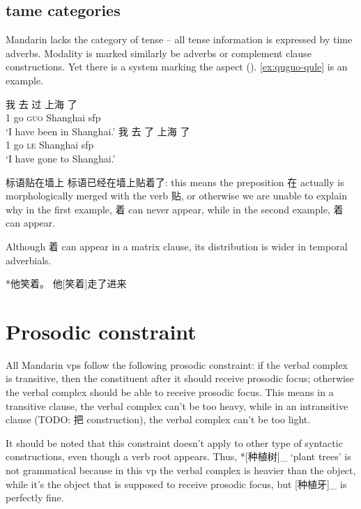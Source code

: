 \documentclass[UTF8, a4paper, oneside, scheme=plain]{ctexrep}
\newcommand{\asis}[1]{\textsc{#1}}
\newcommand{\translate}[1]{`#1'}
\begin{document}
\subsection{\acs{tame} categories}

Mandarin lacks the category of tense -- 
all tense information is expressed by time adverbs.
Modality is marked similarly be adverbs or complement clause constructions.
Yet there is a system marking the aspect (). 
\eqref{ex:quguo-qule} is an example.

\begin{exe}
    \ex \begin{xlist}
        \ex \gll 我 去 过 上海 了 \\
        1 go \asis{guo} Shanghai \acs{sfp} \\
        \glt \translate{I have been in Shanghai.}
        \ex \gll 我 去 了 上海 了 \\
        1 go \asis{le} Shanghai \acs{sfp} \\
        \glt \translate{I have gone to Shanghai.}
    \end{xlist}
    \label{ex:quguo-qule}
\end{exe}

标语贴在墙上 标语已经在墙上贴着了: 
this means the preposition 在 actually is morphologically merged with the verb 贴, 
or otherwise we are unable to explain why 
in the first example, 着 can never appear, 
while in the second example, 着 can appear.

Although 着 can appear in a matrix clause, 
its distribution is wider in temporal adverbials. 

*他笑着。
他[笑着]走了进来

\section{Prosodic constraint}\label{sec:vp.prosody}

All Mandarin \acs{vp}s follow the following prosodic constraint:
if the verbal complex is transitive,
then the constituent after it should receive prosodic focus; 
otherwise the verbal complex should be able to receive prosodic focus. 
This means in a transitive clause, 
the verbal complex can't be too heavy, 
while in an intransitive clause (TODO: 把 construction), 
the verbal complex can't be too light. 

It should be noted that this constraint doesn't apply 
to other type of syntactic constructions, 
even though a verb root appears. 
Thus, *[种植树]_{} \translate{plant trees} 
is not grammatical
because in this \acs{vp} the verbal complex is heavier than the object, 
while it's the object that is supposed to receive prosodic focus, 
but [种植牙]_{} is perfectly fine. 
\end{document}
